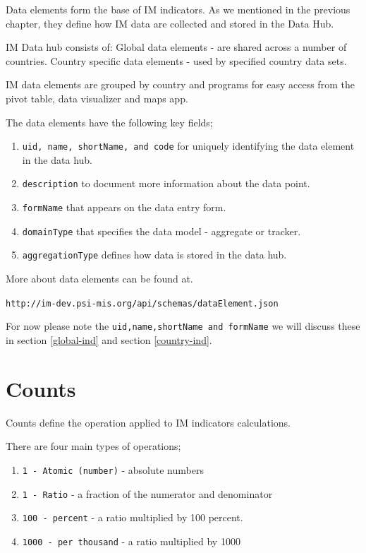 \documentclass[]{book}
\providecommand{\tightlist}{%
  \setlength{\itemsep}{0pt}\setlength{\parskip}{0pt}}
\begin{document}
Data elements form the base of IM indicators. As we mentioned in the previous chapter, they define how IM data are collected and stored in the Data Hub.

IM Data hub consists of:
Global data elements - are shared across a number of countries.
Country specific data elements - used by specified country data sets.

IM data elements are grouped by country and programs for easy access from the pivot table, data visualizer and maps app.

The data elements have the following key fields;

\begin{enumerate}
\def\labelenumi{\arabic{enumi}.}
\tightlist
\item
  \texttt{uid,\ name,\ shortName,\ and\ code} for uniquely identifying the data element in the data hub.
\item
  \texttt{description} to document more information about the data point.
\item
  \texttt{formName} that appears on the data entry form.
\item
  \texttt{domainType} that specifies the data model - aggregate or tracker.
\item
  \texttt{aggregationType} defines how data is stored in the data hub.
\end{enumerate}

More about data elements can be found at.

\texttt{http://im-dev.psi-mis.org/api/schemas/dataElement.json}

For now please note the \texttt{uid,name,shortName\ and\ formName} we will discuss these in section \ref{global-ind} and section \ref{country-ind}.

\hypertarget{counts}{%
\section{Counts}\label{counts}}

Counts define the operation applied to IM indicators calculations.

There are four main types of operations;

\begin{enumerate}
\def\labelenumi{\arabic{enumi}.}
\tightlist
\item
  \texttt{1\ -\ Atomic\ (number)} - absolute numbers
\item
  \texttt{1\ -\ Ratio} - a fraction of the numerator and denominator
\item
  \texttt{100\ -\ percent} - a ratio multiplied by 100 percent.
\item
  \texttt{1000\ -\ per\ thousand} - a ratio multiplied by 1000
\end{enumerate}
\end{document}
